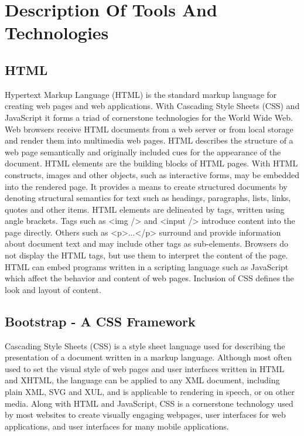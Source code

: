 \chapter{Description Of Tools And Technologies}



\section{HTML}
Hypertext Markup Language (HTML) is the standard markup language for creating web pages and web applications. With Cascading Style Sheets (CSS) and JavaScript it forms a triad of cornerstone technologies for the World Wide Web. Web browsers receive HTML documents from a web server or from local storage and render them into multimedia web pages. HTML describes the structure of a web page semantically and originally included cues for the appearance of the document.
HTML elements are the building blocks of HTML pages. With HTML constructs, images and other objects, such as interactive forms, may be embedded into the rendered page. It provides a means to create structured documents by denoting structural semantics for text such as headings, paragraphs, lists, links, quotes and other items. HTML elements are delineated by tags, written using angle brackets. Tags such as <img /> and <input /> introduce content into the page directly. Others such as <p>...</p> surround and provide information about document text and may include other tags as sub-elements. Browsers do not display the HTML tags, but use them to interpret the content of the page.
HTML can embed programs written in a scripting language such as JavaScript which affect the behavior and content of web pages. Inclusion of CSS defines the look and layout of content. 

\section{Bootstrap - A CSS Framework}
Cascading Style Sheets (CSS) is a style sheet language used for describing the presentation of a document written in a markup language. Although most often used to set the visual style of web pages and user interfaces written in HTML and XHTML, the language can be applied to any XML document, including plain XML, SVG and XUL, and is applicable to rendering in speech, or on other media. Along with HTML and JavaScript, CSS is a cornerstone technology used by most websites to create visually engaging webpages, user interfaces for web applications, and user interfaces for many mobile applications.

